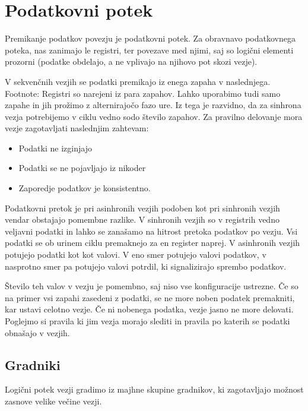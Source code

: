 \section{Podatkovni potek} \label{a}

Premikanje podatkov povezju je podatkovni potek. Za obravnavo podatkovnega poteka, nas zanimajo le registri, ter povezave med njimi, saj so logični elementi prozorni (podatke obdelajo, a ne vplivajo na njihovo pot skozi vezje).

V sekvenčnih vezjih se podatki premikajo iz enega zapaha v naslednjega.
 Footnote: Registri so narejeni iz para zapahov. Lahko uporabimo tudi samo zapahe in jih prožimo z alternirajočo fazo ure. Iz tega je razvidno, da za sinhrona vezja potrebijemo v ciklu vedno sodo število zapahov. 
Za pravilno delovanje mora vezje zagotavljati naslednjim zahtevam: 

\begin{itemize}
	\item Podatki ne izginjajo
	\item Podatki se ne pojavljajo iz nikoder
	\item Zaporedje podatkov je konsistentno.
\end{itemize}

Podatkovni pretok je pri asinhronih vezjih podoben kot pri sinhronih vezjih vendar obstajajo pomembne razlike. 
V sinhronih vezjih so v registrih vedno veljavni podatki in lahko se zanašamo na hitrost pretoka podatkov po vezju. Vsi podatki se ob urinem ciklu premaknejo za en register naprej.
V asinhronih vezjih potujejo podatki kot kot valovi. V eno smer potujejo valovi podatkov, v nasprotno smer pa potujejo valovi potrdil, ki signalizirajo sprembo podatkov. 

Število teh valov v vezju je pomembno, saj niso vse konfiguracije ustrezne. Če so na primer vsi zapahi zasedeni z podatki, se ne more noben podatek premakniti, kar ustavi celotno vezje. Če ni nobenega podatka, vezje jasno ne more delovati. Poglejmo si pravila ki jim vezja morajo slediti in pravila po katerih se podatki obnašajo v vezjih.


%
%

\subsection{Gradniki} \label{b}
Logični potek vezji gradimo iz majhne skupine gradnikov, ki zagotavljajo možnost zasnove velike večine vezji.



